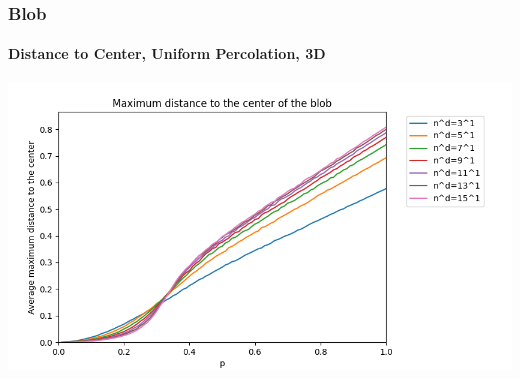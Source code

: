 \documentclass{beamer}
\begin{document}
	\begin{frame}
		\frametitle{Blob}
		\framesubtitle{Distance to Center, Uniform Percolation, 3D}
		\includegraphics[scale=0.5]{imgs/blob_dist_3D_bis.png}
	\end{frame}
\end{document}
